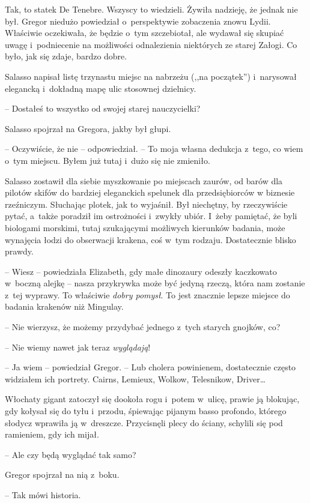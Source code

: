 \documentclass[oneside,polish,12pt,sfheadings]{mwbk}
\begin{document}
Tak, to statek De Tenebre. Wszyscy to wiedzieli. Żywiła nadzieję, że
jednak nie był. Gregor niedużo powiedział o~perspektywie zobaczenia
znowu Lydii. Właściwie oczekiwała, że będzie o~tym szczebiotał, ale
wydawał się skupiać uwagę i~podniecenie na możliwości odnalezienia
niektórych ze starej Załogi. Co było, jak się zdaje, bardzo dobre.

Salasso napisał listę trzynastu miejsc na nabrzeżu (,,na początek'') i~narysował elegancką i~dokładną mapę ulic stosownej dzielnicy.

-- Dostałeś to wszystko od swojej starej nauczycielki?

Salasso spojrzał na Gregora, jakby był głupi.

-- Oczywiście, że nie -- odpowiedział. -- To moja własna dedukcja z~tego,
co wiem o~tym miejscu. Byłem już tutaj i~dużo się nie zmieniło.

Salasso zostawił dla siebie myszkowanie po miejscach zaurów, od barów
dla pilotów skifów do bardziej eleganckich spelunek dla przedsiębiorców
w biznesie rzeźniczym. Słuchając plotek, jak to wyjaśnił. Był niechętny,
by rzeczywiście pytać, a~także poradził im ostrożności i~zwykły ubiór. I~żeby pamiętać, że byli biologami morskimi, tutaj szukającymi możliwych
kierunków badania, może wynajęcia łodzi do obserwacji krakena, coś w~tym
rodzaju. Dostatecznie blisko prawdy.

-- Wiesz -- powiedziała Elizabeth, gdy małe dinozaury odeszły kaczkowato w~boczną alejkę -- nasza przykrywka może być jedyną rzeczą, która nam
zostanie z~tej wyprawy. To właściwie \emph{dobry pomysł}.  To jest
znacznie lepsze miejsce do badania krakenów niż Mingulay.

-- Nie wierzysz, że możemy przydybać jednego z~tych starych gnojków, co?

-- Nie wiemy nawet jak teraz \emph{wyglądają}!

-- Ja wiem -- powiedział Gregor. -- Lub cholera powinienem, dostatecznie
często widziałem ich portrety. Cairns, Lemieux, Wolkow, Telesnikow,
Driver\ldots

Włochaty gigant zatoczył się dookoła rogu i~potem w~ulicę, prawie ją
blokując, gdy kołysał się do tyłu i~przodu, śpiewając pijanym basso
profondo, którego słodycz wprawiła ją w~dreszcze. Przycisnęli plecy do
ściany, schylili się pod ramieniem, gdy ich mijał.

-- Ale czy będą wyglądać tak samo?

Gregor spojrzał na nią z~boku. 

-- Tak mówi historia.
\end{document}
